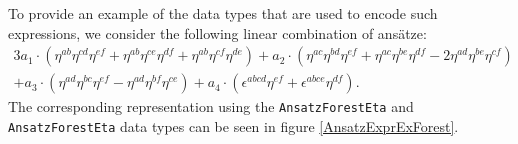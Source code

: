 To provide an example of the data types that are used to encode such expressions, we consider the following linear combination of ansätze:
\begin{multline}\label{AnsatzExprEx}
3a_1 \cdot \left (\eta^{ab}\eta^{cd}\eta^{ef} + \eta^{ab}\eta^{ce}\eta^{df} + \eta^{ab}\eta^{cf}\eta^{de} \right ) + a_2 \cdot \left ( \eta^{ac} \eta^{bd} \eta^{ef} + \eta^{ac} \eta^{be} \eta^{df} -2 \eta^{ad} \eta^{be} \eta^{cf} \right ) \\
+ a_3 \cdot \left ( \eta^{ad} \eta^{bc} \eta^{ef} - \eta^{ad} \eta^{bf} \eta^{ce} \right ) + a_4 \cdot \left ( \epsilon^{abcd} \eta^{ef} + \epsilon^{abce} \eta^{df}  \right )   .
\end{multline}
The corresponding representation using the \texttt{AnsatzForestEta} and \texttt{AnsatzForestEta} data types can be seen in figure \ref{AnsatzExprExForest}.
